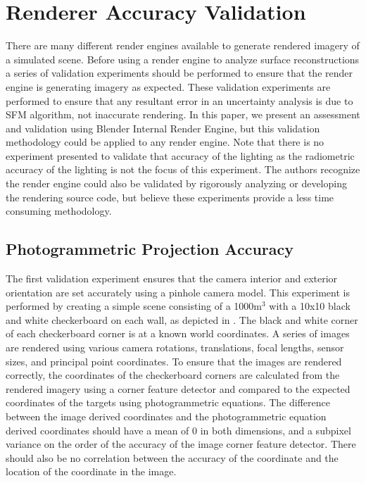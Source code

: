 \section{Renderer Accuracy Validation}

There are many different render engines available to generate rendered imagery of a simulated scene.  Before using a render engine to analyze surface reconstructions a series of validation experiments should be performed to ensure that the render engine is generating imagery as expected.  These validation experiments are performed to ensure that any resultant error in an uncertainty analysis is due to SFM algorithm, not inaccurate rendering.  In this paper, we present an assessment and validation using Blender Internal Render Engine, but this validation methodology could be applied to any render engine.  Note that there is no experiment presented to validate that accuracy of the lighting as the radiometric accuracy of the lighting is not the focus of this experiment.  The authors recognize the render engine could also be validated by rigorously analyzing or developing the rendering source code, but believe these experiments provide a less time consuming methodology.

\subsection{Photogrammetric Projection Accuracy}
The first validation experiment ensures that the camera interior and exterior orientation are set accurately using a pinhole camera model.  This experiment is performed by creating a simple scene consisting of a 1000m$^3$ with a 10x10 black and white checkerboard on each wall, as depicted in .   The black and white corner of each checkerboard corner is at a known world coordinates.  A series of images are rendered using various camera rotations, translations, focal lengths, sensor sizes, and principal point coordinates.  To ensure that the images are rendered correctly, the coordinates of the checkerboard corners are calculated from the rendered imagery using a corner feature detector and compared to the expected coordinates of the targets using photogrammetric equations.  The difference between the image derived coordinates and the photogrammetric equation derived coordinates should have a mean of 0 in both dimensions, and a subpixel variance on the order of the accuracy of the image corner feature detector.  There should also be no correlation between the accuracy of the coordinate and the location of the coordinate in the image.

